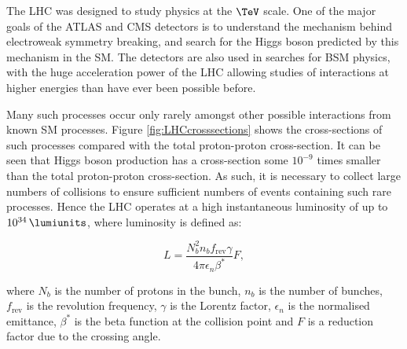 The LHC was designed to study physics at the $\TeV$ scale. One of the major
goals of the ATLAS and CMS detectors is to understand the mechanism behind
electroweak symmetry breaking, and search for the Higgs boson predicted by this
mechanism in the \ac{SM}. The detectors are also used in searches for \ac{BSM}
physics, with the huge acceleration power of the LHC allowing studies of 
interactions at higher energies than have ever been possible before. 

Many such processes occur only rarely amongst other possible interactions from known
\ac{SM} processes. Figure \ref{fig:LHCcrosssections} shows the cross-sections of
such processes compared with the total proton-proton cross-section. It can be
seen that Higgs boson production has a cross-section some $10^{-9}$ times
smaller than the total proton-proton cross-section. 
As such, it is necessary to collect large numbers of
collisions to ensure sufficient numbers of events containing such rare
processes. Hence the LHC operates at a high instantaneous luminosity of up to
$10^{34}\,\lumiunits$, where luminosity is defined as:

\begin{equation}
L=\frac{N_{b}^{2}n_{b}f_{\text{rev}}\gamma}{4\pi\epsilon_{n}\beta^{*}}F,
\end{equation}

where $N_{b}$ is the number of protons in the bunch, $n_{b}$ is the number of
bunches, $f_\text{rev}$ is the revolution frequency, $\gamma$ is the Lorentz
factor, $\epsilon_{n}$ is the normalised emittance, $\beta^{*}$ is the beta
function at the collision point and $F$ is a reduction factor due to the
crossing angle.

